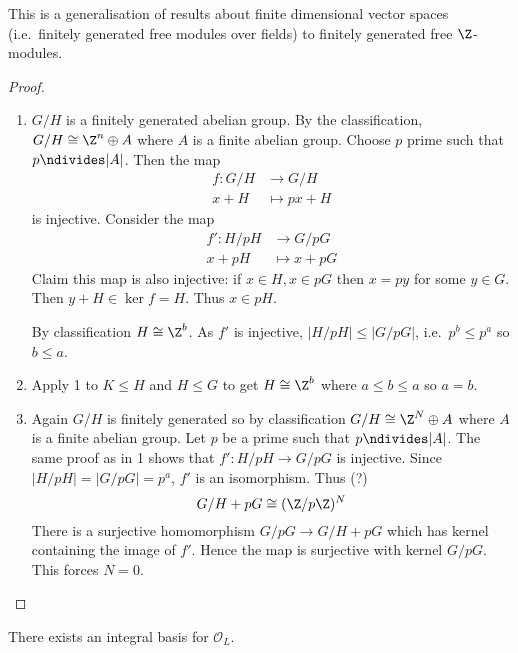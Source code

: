 \documentclass[a4paper]{article}
\renewcommand*{\O}{\mathcal{O}}
\begin{document}
This is a generalisation of results about finite dimensional vector spaces (i.e.\ finitely generated free modules over fields) to finitely generated free \(\Z\)-modules.

\begin{proof}\leavevmode
  \begin{enumerate}
  \item \(G/H\) is a finitely generated abelian group. By the classification, \(G/H \cong \Z^n \oplus A\) where \(A\) is a finite abelian group. Choose \(p\) prime such that \(p \ndivides |A|\). Then the map
    \begin{align*}
      f: G/H &\to G/H \\
      x + H &\mapsto px + H
    \end{align*}
    is injective. Consider the map
    \begin{align*}
      f': H/pH &\to G/pG \\
      x + pH &\mapsto x + pG
    \end{align*}
    Claim this map is also injective: if \(x \in H, x \in pG\) then \(x = py\) for some \(y \in G\). Then \(y + H \in \ker f = H\). Thus \(x \in pH\).

    By classification \(H \cong \Z^b\). As \(f'\) is injective, \(|H/pH| \leq |G/pG|\), i.e.\ \(p^b \leq p^a\) so \(b \leq a\).
  \item Apply 1 to \(K \leq H\) and \(H \leq G\) to get \(H \cong \Z^b\) where \(a \leq b \leq a\) so \(a = b\).
  \item Again \(G/H\) is finitely generated so by classification \(G/H \cong \Z^N \oplus A\) where \(A\) is a finite abelian group. Let \(p\) be a prime such that \(p \ndivides |A|\). The same proof as in 1 shows that \(f': H/pH \to G/pG\) is injective. Since \(|H/pH| = |G/pG| = p^a\), \(f'\) is an isomorphism. Thus (?)
    \[
      G/H + pG \cong (\Z/p\Z)^N
    \]
    There is a surjective homomorphism \(G/pG \to G/H + pG\) which has kernel containing the image of \(f'\). Hence the map is surjective with kernel \(G/pG\). This forces \(N = 0\).
  \end{enumerate}
\end{proof}

\begin{proposition}
  There exists an integral basis for \(\O_L\).
\end{proposition}
\end{document}
